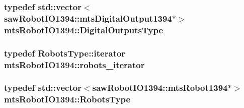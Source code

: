 \hypertarget{classmts_robot_i_o1394_af0825d8e6c2f7bb0ff1fcd85319ffa30}{
\subsubsection[{Digital\-Outputs\-Type}]{\setlength{\rightskip}{0pt plus 5cm}typedef std\-::vector$<$saw\-Robot\-I\-O1394\-::mts\-Digital\-Output1394$\ast$$>$ {\bf mts\-Robot\-I\-O1394\-::\-Digital\-Outputs\-Type}\hspace{0.3cm}{\ttfamily [protected]}}}\label{classmts_robot_i_o1394_af0825d8e6c2f7bb0ff1fcd85319ffa30}
\hypertarget{classmts_robot_i_o1394_a7f8edd25871894ed25f59c68d3c49ece}{
\subsubsection[{robots\-\_\-iterator}]{\setlength{\rightskip}{0pt plus 5cm}typedef Robots\-Type\-::iterator {\bf mts\-Robot\-I\-O1394\-::robots\-\_\-iterator}\hspace{0.3cm}{\ttfamily [protected]}}}\label{classmts_robot_i_o1394_a7f8edd25871894ed25f59c68d3c49ece}
\hypertarget{classmts_robot_i_o1394_ab8da6d2d438f82df01169c5bd528c9b3}{
\subsubsection[{Robots\-Type}]{\setlength{\rightskip}{0pt plus 5cm}typedef std\-::vector$<$saw\-Robot\-I\-O1394\-::mts\-Robot1394$\ast$$>$ {\bf mts\-Robot\-I\-O1394\-::\-Robots\-Type}\hspace{0.3cm}{\ttfamily [protected]}}}\label{classmts_robot_i_o1394_ab8da6d2d438f82df01169c5bd528c9b3}


